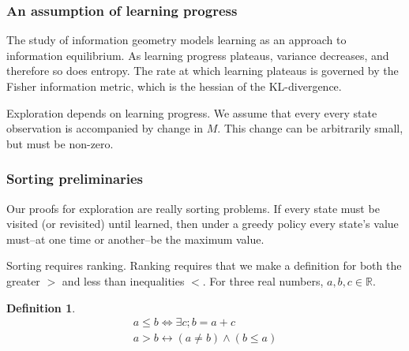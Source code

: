 \documentclass[9pt,twocolumn,twoside]{pnas-new}
\newtheorem{definition}{Definition}
\begin{document}
\subsubsection*{An assumption of learning progress}
The study of information geometry models learning as an approach to information equilibrium. As learning progress plateaus, variance decreases, and therefore so does entropy. The rate at which learning plateaus is governed by the Fisher information metric, which is the hessian of the KL-divergence.


Exploration depends on learning progress. We assume that every every state observation is accompanied by change in $M$. This change can be arbitrarily small, but must be non-zero. 

\subsubsection*{Sorting preliminaries}
Our proofs for exploration are really sorting problems. If every state must be visited (or revisited) until learned, then under a greedy policy every state's value must--at one time or another--be the maximum value. 

Sorting requires ranking. Ranking requires that we make a definition for both the greater $>$ and less than inequalities $<$. For three real numbers, ${a,b,c} \in \mathbb{R}$.

\begin{definition} \label{def:ineq}
    \begin{align}
        a \leq b \Leftrightarrow \exists c; b = a + c \\
        a > b \leftrightarrow (a \neq b) \wedge (b \leq a) 
    \end{align}
\end{definition}
\end{document}
